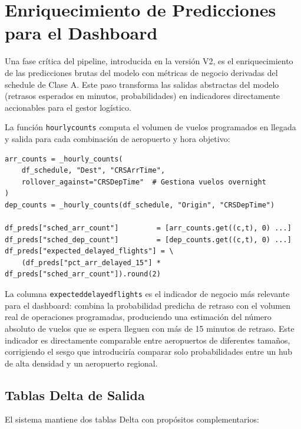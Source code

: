 \documentclass[12pt,oneside,a4paper]{report}
\renewcommand{\_}{\textunderscore\allowbreak}
\begin{document}
\section{Enriquecimiento de Predicciones para el Dashboard}
\label{sec:enriquecimiento}

Una fase crítica del pipeline, introducida en la versión V2, es el enriquecimiento de las predicciones brutas del modelo con métricas de negocio derivadas del schedule de Clase A. Este paso transforma las salidas abstractas del modelo (retrasos esperados en minutos, probabilidades) en indicadores directamente accionables para el gestor logístico.

La función \texttt{\_hourly\_counts} computa el volumen de vuelos programados en llegada y salida para cada combinación de aeropuerto y hora objetivo:

\begin{lstlisting}[style=pystyle, caption={Cálculo del volumen de vuelos programados por aeropuerto y hora.}]
arr_counts = _hourly_counts(
    df_schedule, "Dest", "CRSArrTime",
    rollover_against="CRSDepTime"  # Gestiona vuelos overnight
)
dep_counts = _hourly_counts(df_schedule, "Origin", "CRSDepTime")

df_preds["sched_arr_count"]         = [arr_counts.get((c,t), 0) ...]
df_preds["sched_dep_count"]         = [dep_counts.get((c,t), 0) ...]
df_preds["expected_delayed_flights"] = \
    (df_preds["pct_arr_delayed_15"] * df_preds["sched_arr_count"]).round(2)
\end{lstlisting}

La columna \texttt{expected\_delayed\_flights} es el indicador de negocio más relevante para el dashboard: combina la probabilidad predicha de retraso con el volumen real de operaciones programadas, produciendo una estimación del número absoluto de vuelos que se espera lleguen con más de 15 minutos de retraso. Este indicador es directamente comparable entre aeropuertos de diferentes tamaños, corrigiendo el sesgo que introduciría comparar solo probabilidades entre un hub de alta densidad y un aeropuerto regional.

\subsection{Tablas Delta de Salida}
\label{sub:tablas_delta}

El sistema mantiene dos tablas Delta con propósitos complementarios:
\end{document}
